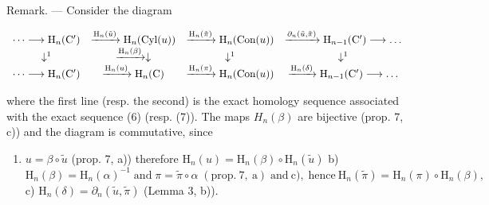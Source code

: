 Remark. --- Consider the diagram

\[
\begin{array}{c c c c c} \dots \longrightarrow \mathrm{H} _ {n} (\mathrm{C} ^ {\prime}) & \xrightarrow {\mathrm{H} _ {n} (\tilde {u})} \mathrm{H} _ {n} (\text {Cyl} (u)) & \xrightarrow {\mathrm{H} _ {n} (\tilde {\pi})} \mathrm{H} _ {n} (\text {Con} (u)) & \xrightarrow {\partial_ {n} (\tilde {u} , \tilde {\pi})} \mathrm{H} _ {n - 1} (\mathrm{C} ^ {\prime}) \longrightarrow \dots \\ \downarrow^ {1} & \xrightarrow {\mathrm{H} _ {n} (\beta)} \downarrow & \downarrow^ {1} & \downarrow^ {1} \\ \dots \longrightarrow \mathrm{H} _ {n} (\mathrm{C} ^ {\prime}) & \xrightarrow {\mathrm{H} _ {n} (u)} \mathrm{H} _ {n} (\mathrm{C}) & \xrightarrow {\mathrm{H} _ {n} (\pi)} \mathrm{H} _ {n} (\text {Con} (u)) & \xrightarrow {\mathrm{H} _ {n} (\delta)} \mathrm{H} _ {n - 1} (\mathrm{C} ^ {\prime}) \longrightarrow \dots \end{array}
\]

where the first line (resp. the second) is the exact homology sequence associated with the exact sequence (6) (resp. (7)). The maps \(H_{n}(\beta)\) are bijective (prop. 7, c)) and the diagram is commutative, since

\begin{enumerate}
\def\labelenumi{\alph{enumi})}
\tightlist
\item
  \(u = \beta \circ \tilde{u}\) (prop. 7, a)) therefore \(\mathrm{H}_n(u) = \mathrm{H}_n(\beta) \circ \mathrm{H}_n(\tilde{u})\) b) \(\mathrm{H}_{n}(\beta)=\mathrm{H}_{n}(\alpha)^{-1}\;\mathrm{and}\;\pi=\tilde{\pi}\circ\alpha\;(\mathrm{prop.~7,~a})\;\mathrm{and~c}),\;\mathrm{hence~}\mathrm{H}_{n}(\tilde{\pi})=\mathrm{H}_{n}(\pi)\circ\mathrm{H}_{n}(\beta),\) c) \(\mathrm{H}_{n}(\delta)=\partial_{n}(\tilde{u},\tilde{\pi})\) (Lemma 3, b)).
\end{enumerate}

